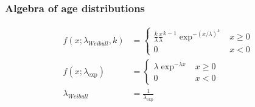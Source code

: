 \documentclass{beamer}
\begin{document}
\begin{frame}
  \frametitle{Algebra of age distributions}

  \begingroup
    \addtolength{\jot}{1em}
    \begin{align*}
      f(x; \lambda_{Weibull}, k) &= 
      \begin{cases}
        \frac{k}{\lambda} \frac{x}{\lambda}^{k - 1} \exp^{-(x / \lambda)^{k}} & x \geq 0 \\
        0 & x < 0
      \end{cases} \\
      f(x; \lambda_{\exp}) &= 
      \begin{cases}
        \lambda \exp^{- \lambda x} & x \geq 0 \\
        0 & x < 0
      \end{cases} \\
      \lambda_{Weibull} &= \frac{1}{\lambda_{\exp}} \\
    \end{align*}
  \endgroup

\end{frame}
\end{document}
